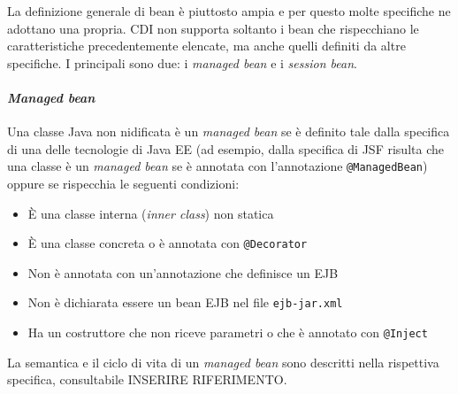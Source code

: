 La definizione generale di bean è piuttosto ampia e per questo molte specifiche ne adottano una propria. CDI non supporta soltanto i bean che rispecchiano le caratteristiche precedentemente elencate, ma anche quelli definiti da altre specifiche. I principali sono due: i \textit{managed bean} e i \textit{session bean}.

\paragraph{\textit{Managed bean}} Una classe Java non nidificata è un \textit{managed bean} se è definito tale dalla specifica di una delle tecnologie di Java EE (ad esempio, dalla specifica di JSF risulta che una classe è un \textit{managed bean} se è annotata con l'annotazione \lstinline{@ManagedBean}) oppure se rispecchia le seguenti condizioni:
\begin{itemize}
\item È una classe interna (\textit{inner class}) non statica
\item È una classe concreta o è annotata con \lstinline{@Decorator}
\item Non è annotata con un'annotazione che definisce un EJB
\item Non è dichiarata essere un bean EJB nel file \texttt{ejb-jar.xml}
\item Ha un costruttore che non riceve parametri o che è annotato con \lstinline{@Inject}
\end{itemize}

La semantica e il ciclo di vita di un \textit{managed bean} sono descritti nella rispettiva specifica, consultabile INSERIRE RIFERIMENTO.

